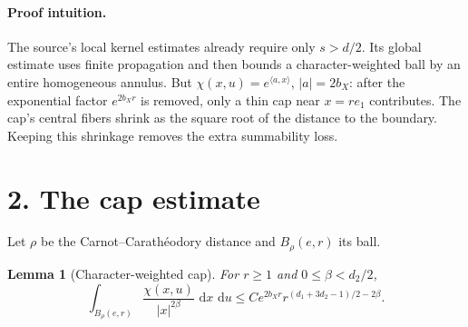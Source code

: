 \documentclass[10pt,a4paper]{article}
\newtheorem{lemma}{Lemma}
\newcommand{\dd}{\,\mathrm d}
\begin{document}
\paragraph{Proof intuition.}
The source's local kernel estimates already require only $s>d/2$.  Its global
estimate uses finite propagation and then bounds a character-weighted ball by
an entire homogeneous annulus.  But $\chi(x,u)=e^{\langle a,x\rangle}$,
$|a|=2b_X$: after the exponential factor $e^{2b_Xr}$ is removed, only a thin
cap near $x=re_1$ contributes.  The cap's central fibers shrink as the square
root of the distance to the boundary.  Keeping this shrinkage removes the
extra summability loss.

\section*{2. The cap estimate}

Let $\rho$ be the Carnot--Carathéodory distance and $B_\rho(e,r)$ its ball.

\begin{lemma}[Character-weighted cap]\label{lem:cap}
For $r\ge1$ and $0\le\beta<d_2/2$,
\begin{equation}\label{eq:cap}
 \int_{B_\rho(e,r)}\frac{\chi(x,u)}{|x|^{2\beta}}\,\dd x\,\dd u
 \le C e^{2b_Xr}
 r^{(d_1+3d_2-1)/2-2\beta}.
\end{equation}
\end{lemma}
\end{document}

